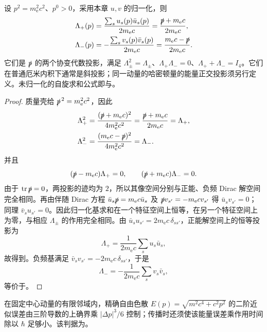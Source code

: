 \begin{proposition}[自由旋量的完备关系]
设 $p^2=m_{\mathrm e}^2c^2$、$p^0>0$，采用本章 $u,v$ 的归一化，则
\begin{align*}
\Lambda_+(p)&=\frac{\sum_su_s(p)\bar u_s(p)}{2m_{\mathrm e}c}
=\frac{\slashed p+m_{\mathrm e}c}{2m_{\mathrm e}c},\\
\Lambda_-(p)&=-\frac{\sum_sv_s(p)\bar v_s(p)}{2m_{\mathrm e}c}
=\frac{m_{\mathrm e}c-\slashed p}{2m_{\mathrm e}c}.
\end{align*}
它们是 $\slashed p$ 的两个协变代数投影，满足 $\Lambda_\pm^2=\Lambda_\pm$、$\Lambda_+\Lambda_-=0$、$\Lambda_++\Lambda_-=I_4$。它们在普通厄米内积下通常是斜投影；同一动量的哈密顿量的能量正交投影须另行定义。未归一化的自旋求和公式即与。
\end{proposition}

\begin{proof}
质量壳给 $\slashed p^{\,2}=m_{\mathrm e}^2c^2$，因此
\begin{align*}
\Lambda_+^2
&=\frac{(\slashed p+m_{\mathrm e} c)^2}{4m_{\mathrm e}^2c^2}
=\frac{\slashed p+m_{\mathrm e} c}{2m_{\mathrm e} c}=\Lambda_+,\\
\Lambda_-^2
&=\frac{(m_{\mathrm e} c-\slashed p)^2}{4m_{\mathrm e}^2c^2}
=\Lambda_-.
\end{align*}
并且
\begin{equation*}
(\slashed p-m_{\mathrm e} c)\Lambda_+=0,
\qquad
(\slashed p+m_{\mathrm e} c)\Lambda_-=0.
\end{equation*}
由于 $\operatorname{tr}\slashed p=0$，两投影的迹均为 $2$，所以其像空间分别与正能、负频 Dirac 解空间完全相同。再由伴随 Dirac 方程 $\bar u_s\slashed p=m_{\mathrm e}c\bar u_s$ 及 $\slashed p v_{s'}=-m_{\mathrm e}cv_{s'}$ 得 $\bar u_sv_{s'}=0$；同理 $\bar v_su_{s'}=0$。因此归一化基求和在一个特征空间上恒等，在另一个特征空间上为零，与相应 $\Lambda_\pm$ 的作用完全相同。由 $\bar u_su_{s'}=2m_{\mathrm e} c\,\delta_{ss'}$，正能解空间上的恒等投影为
\begin{equation*}
\Lambda_+=\frac1{2m_{\mathrm e} c}\sum_su_s\bar u_s,
\end{equation*}
故得到。负频基满足 $\bar v_sv_{s'}=-2m_{\mathrm e} c\,\delta_{ss'}$，于是
\begin{equation*}
\Lambda_-=-\frac1{2m_{\mathrm e} c}\sum_sv_s\bar v_s,
\end{equation*}
等价于。
\end{proof}

\begin{proposition}
在固定中心动量的有限邻域内，精确自由色散 $E(p)=\sqrt{m^2c^4+c^2p^2}$ 的二阶近似误差由三阶导数的上确界乘 $|\Delta p|^3/6$ 控制；传播时还须使该能量误差乘作用时间除以 $\hbar$ 足够小。该判据为。
\end{proposition}

